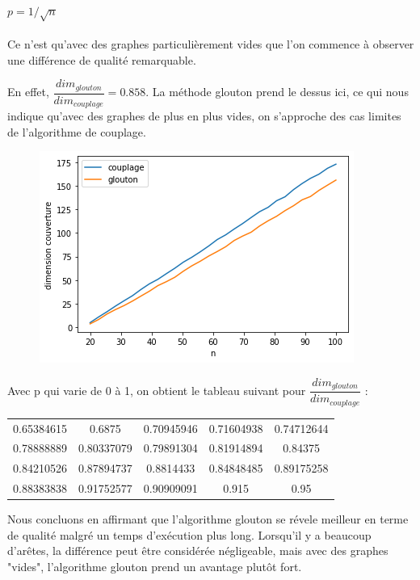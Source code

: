 \documentclass[12pt]{article}
\begin{document}
\begin{enumerate}
                \paragraph{$p = 1/ \sqrt{n}$}
                    Ce n'est qu'avec des graphes particulièrement vides que l'on commence à observer une différence de qualité remarquable.

                    En effet, $\dfrac{dim_{glouton}}{dim_{couplage}} = 0.858 $.
                    La méthode glouton prend le dessus ici, ce qui nous indique qu'avec des graphes de plus en plus vides, on s'approche des cas limites de l'algorithme de couplage.

                    \begin{figure}[H]
                        \includegraphics[scale=0.5]{figures/qualite_p.png}
                        \centering
                    \end{figure}

                Avec p qui varie de 0 à 1, on obtient le tableau suivant pour $\dfrac{dim_{glouton}}{dim_{couplage}}$ :

                \begin{center}
                    \begin{tabular}{ |c c c c c| } 
                    \hline
                    0.65384615 & 0.6875 &    0.70945946  & 0.71604938 & 0.74712644  \\
                    0.78888889 & 0.80337079 & 0.79891304 & 0.81914894 & 0.84375   \\
                    0.84210526  & 0.87894737 & 0.8814433 & 0.84848485 & 0.89175258 \\
                    0.88383838 &  0.91752577 & 0.90909091 & 0.915   &    0.95\\
                    \hline
                    \end{tabular}
                \end{center}

                Nous concluons en affirmant que l'algorithme glouton se révele meilleur en terme de qualité malgré un temps d'exécution plus long.
                Lorsqu'il y a beaucoup d'arêtes, la différence peut être considérée négligeable, mais avec des graphes "vides", l'algorithme glouton prend un avantage plutôt fort.

        \end{enumerate}
\end{document}
